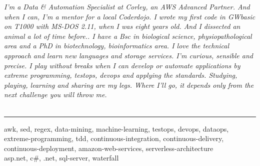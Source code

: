 \documentclass[9pt]{stackoverflow} %
\begin{document}
\begin{minipage}[t]{0.1\textwidth}\vspace{\baselineskip}\hfill\end{minipage}
\begin{minipage}[t]{0.8\textwidth} %
	\vspace{\baselineskip} %
	\vspace{\baselineskip} %
	{\normalsize\emph{I'm a Data \& Automation Specialist at Corley, an AWS Advanced Partner. And when I can, I'm a mentor for a local Coderdojo.
	I wrote my first code in GWbasic on T1000 with MS-DOS 2.11, when I was eight years old. And I dissected an animal a lot of time before..
	I have a Bsc in biological science, physiopathological area and a PhD in biotechnology, bioinformatics area.
	I love the technical approach and learn new languages and storage services. I'm curious, sensible and precise.
	I play without breaks when I can develop or automate applications by extreme programming, testops, devops and applying the standards.
	Studying, playing, learning and sharing are my legs. Where I'll go, it depends only from the next challenge you will throw me.
	}}\\\\
\end{minipage}
\begin{minipage}[t]{0.1\textwidth}\vspace{\baselineskip}\end{minipage}


\textcolor{stackoverflow}{\hrule}
\begin{minipage}[t]{0.25\textwidth}
	\vspace{\baselineskip} %
\end{minipage}
\begin{minipage}[t]{0.75\textwidth}
	\vspace{\baselineskip} %
	{\small
			{awk, sed, regex, data-mining, machine-learning, testops, devops, dataops, extreme-programming, tdd, continuous-integration, continuous-delivery, continuous-deployment, amazon-web-services, serverless-architecture\\}
			{asp.net, c\#, .net, sql-server, waterfall}
	}
\end{minipage}
\end{document}
